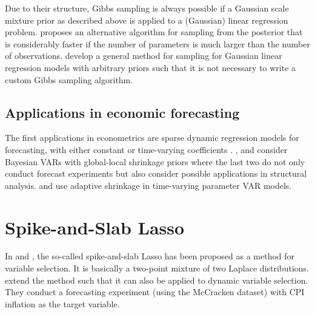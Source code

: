 \documentclass[12pt,a4paper]{scrartcl}
\begin{document}
Due to their structure, Gibbs sampling is always possible if a Gaussian scale mixture prior as described above is applied to a (Gaussian) linear regression problem. \citet{BhattacharyaEtal2016} proposes an alternative algorithm for sampling from the posterior that is considerably faster if the number of parameters is much larger than the number of observations. \citet{HahnEtal2018} develop a general method for sampling for Gaussian linear regression models with arbitrary priors such that it is not necessary to write a custom Gibbs sampling algorithm.

\subsection*{Applications in economic forecasting}

The first applications in econometrics are sparse dynamic regression models for forecasting, with either constant \citep{Korobilis2013} or time-varying coefficients \citep{KalliGriffin2014, BelmonteEtal2014}. \citet{Gefang2014}, \citet{HuberFeldkircher2017} and \citet{KorobilisPettenuzzo2017} consider Bayesian VARs with global-local shrinkage priors where the last two do not only conduct forecast experiments but also consider possible applications in structural analysis. \citet{HuberEtal2016} and \citet{FeldkircherEtal2017} use adaptive shrinkage in time-varying parameter VAR models.

\section{Spike-and-Slab Lasso}

In \citet{RockovaGeorge2016} and \citet{Rockova2018}, the so-called spike-and-slab Lasso has been proposed as a method for variable selection. It is basically a two-point mixture of two Laplace distributions. \citet{RockovaMcAlinn2017} extend the method such that it can also be applied to dynamic variable selection. They conduct a forecasting experiment (using the McCracken dataset) with CPI inflation as the target variable.



\end{document}
